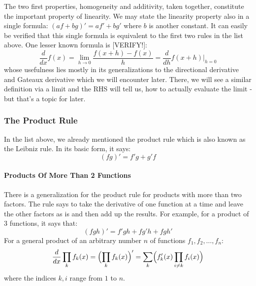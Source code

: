 The two first properties, homogeneity and additivity, taken together, constitute the important property of linearity. We may state the linearity property also in a single formula: $(a f + b g)' = a f' + b g'$ where $b$ is another constant. It can easily be verified that this single formula is equivalent to the first two rules in the list above. One lesser known formula is [VERIFY!]:
\begin{equation}
\label{Eq:DerivativeViaH}
 \frac{d}{d x} f(x) 
 = \lim_{h \rightarrow 0} \frac{f(x + h) - f(x)}{h}
 = \frac{d}{d h} f(x + h) \bigg\rvert_{h=0}
\end{equation}
whose usefulness lies mostly in its generalizations to the directional derivative and Gateaux derivative which we will encounter later. There, we will see a similar definition via a limit and the RHS will tell us, how to actually evaluate the limit - but that's a topic for later. 




\subsubsection{The Product Rule}
In the list above, we already mentioned the product rule which is also known as the Leibniz rule. In its basic form, it says:
\begin{equation}
 (f g)'  = f' g + g' f
\end{equation}

\paragraph{Products Of More Than 2 Functions}

There is a generalization for the product rule for products with more than two factors. The rule says to take the derivative of one function at a time and leave the other factors as is and then add up the results. For example, for a product of 3 functions, it says that:
\begin{equation}
(fgh)' =  f' g h + f g' h + f g h'
\end{equation}
For a general product of an arbitrary number $n$ of functions $f_1, f_2, \ldots, f_n$:
\begin{equation}
\frac{d}{dx} \prod_k f_k(x)  
= \Bigl(  \prod_k f_k(x)   \Bigr) '
= \sum_k \Bigl( f_k'(x) \prod_{i \neq k} f_i(x)  \Bigr) 
\end{equation}
where the indices $k,i$ range from $1$ to $n$.

